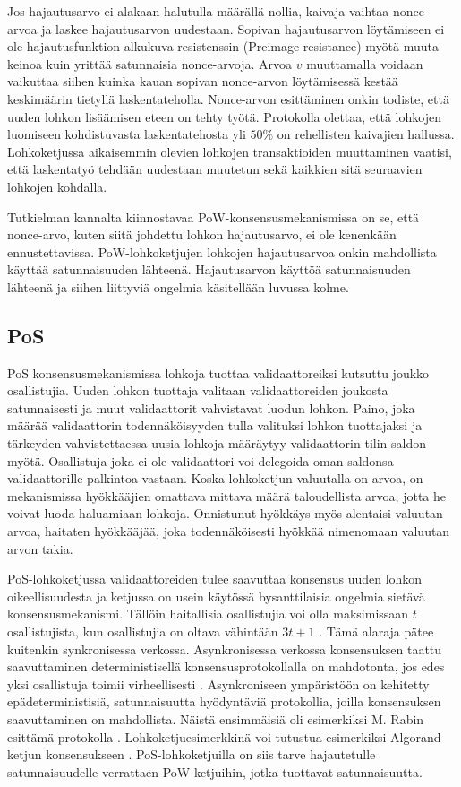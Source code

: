 Jos hajautusarvo ei alakaan halutulla määrällä nollia, kaivaja vaihtaa nonce-arvoa ja laskee hajautusarvon uudestaan. Sopivan hajautusarvon löytämiseen ei ole hajautusfunktion alkukuva resistenssin (Preimage resistance) myötä muuta keinoa kuin yrittää satunnaisia nonce-arvoja. Arvoa $v$ muuttamalla voidaan vaikuttaa siihen kuinka kauan sopivan nonce-arvon löytämisessä kestää keskimäärin tietyllä laskentateholla. Nonce-arvon esittäminen onkin todiste, että uuden lohkon lisäämisen eteen on tehty työtä. Protokolla olettaa, että lohkojen luomiseen kohdistuvasta laskentatehosta yli $50\%$ on rehellisten kaivajien hallussa. Lohkoketjussa aikaisemmin olevien lohkojen transaktioiden muuttaminen vaatisi, että laskentatyö tehdään uudestaan muutetun sekä kaikkien sitä seuraavien lohkojen kohdalla.

Tutkielman kannalta kiinnostavaa PoW-konsensusmekanismissa on se, että nonce-arvo, kuten siitä johdettu lohkon hajautusarvo, ei ole kenenkään ennustettavissa. PoW-lohkoketjujen lohkojen hajautusarvoa onkin mahdollista käyttää satunnaisuuden lähteenä. Hajautusarvon käyttöä satunnaisuuden lähteenä ja siihen liittyviä ongelmia käsitellään luvussa kolme.

\subsection{PoS}

PoS konsensusmekanismissa lohkoja tuottaa validaattoreiksi kutsuttu joukko osallistujia. Uuden lohkon tuottaja valitaan validaattoreiden joukosta satunnaisesti ja muut validaattorit vahvistavat luodun lohkon. Paino, joka määrää validaattorin todennäköisyyden tulla valituksi lohkon tuottajaksi ja tärkeyden vahvistettaessa uusia lohkoja määräytyy validaattorin tilin saldon myötä. Osallistuja joka ei ole validaattori voi delegoida oman saldonsa validaattorille palkintoa vastaan. Koska lohkoketjun valuutalla on arvoa, on mekanismissa hyökkääjien omattava mittava määrä taloudellista arvoa, jotta he voivat luoda haluamiaan lohkoja. Onnistunut hyökkäys myös alentaisi valuutan arvoa, haitaten hyökkääjää, joka todennäköisesti hyökkää nimenomaan valuutan arvon takia.

PoS-lohkoketjussa validaattoreiden tulee saavuttaa konsensus uuden lohkon oikeellisuudesta ja ketjussa on usein käytössä bysanttilaisia ongelmia sietävä konsensusmekanismi. Tällöin haitallisia osallistujia voi olla maksimissaan $t$ osallistujista, kun osallistujia on oltava vähintään $3t + 1$ \cite{10.1145/322186.322188}. Tämä alaraja pätee kuitenkin synkronisessa verkossa. Asynkronisessa verkossa konsensuksen taattu saavuttaminen deterministisellä konsensusprotokollalla on mahdotonta, jos edes yksi osallistuja toimii virheellisesti \cite{fischer_impossibility_1985}. Asynkroniseen ympäristöön on kehitetty epädeterministisiä, satunnaisuutta hyödyntäviä protokollia, joilla konsensuksen saavuttaminen on mahdollista. Näistä ensimmäisiä oli esimerkiksi M. Rabin esittämä protokolla \cite{10.1109/SFCS.1983.48}. Lohkoketjuesimerkkinä voi tutustua esimerkiksi Algorand ketjun konsensukseen \cite{gilad_algorand_2017}. PoS-lohkoketjuilla on siis tarve hajautetulle satunnaisuudelle verrattaen PoW-ketjuihin, jotka tuottavat satunnaisuutta.

